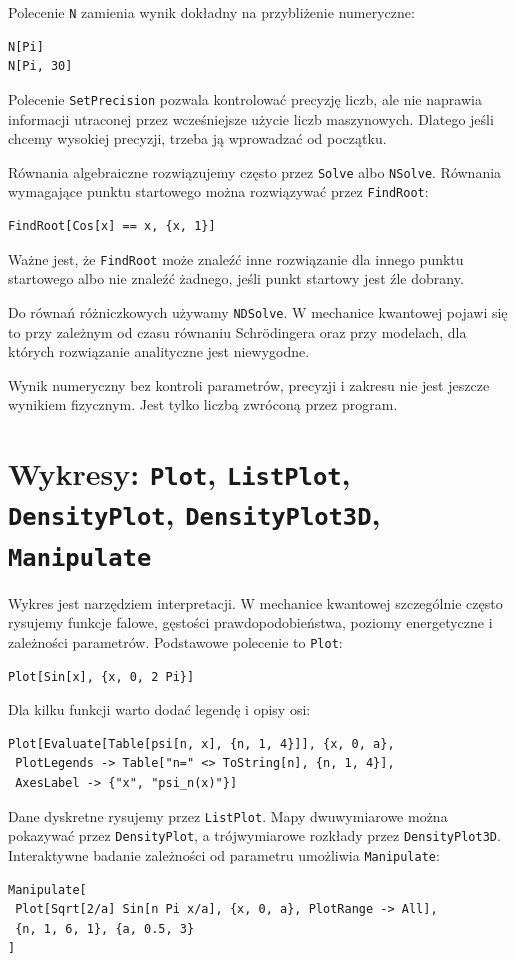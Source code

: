 Polecenie \texttt{N} zamienia wynik dokładny na przybliżenie numeryczne:
\begin{verbatim}
N[Pi]
N[Pi, 30]
\end{verbatim}
Polecenie \texttt{SetPrecision} pozwala kontrolować precyzję liczb, ale nie naprawia informacji utraconej przez wcześniejsze użycie liczb maszynowych. Dlatego jeśli chcemy wysokiej precyzji, trzeba ją wprowadzać od początku.

Równania algebraiczne rozwiązujemy często przez \texttt{Solve} albo \texttt{NSolve}. Równania wymagające punktu startowego można rozwiązywać przez \texttt{FindRoot}:
\begin{verbatim}
FindRoot[Cos[x] == x, {x, 1}]
\end{verbatim}
Ważne jest, że \texttt{FindRoot} może znaleźć inne rozwiązanie dla innego punktu startowego albo nie znaleźć żadnego, jeśli punkt startowy jest źle dobrany.

Do równań różniczkowych używamy \texttt{NDSolve}. W mechanice kwantowej pojawi się to przy zależnym od czasu równaniu Schrödingera oraz przy modelach, dla których rozwiązanie analityczne jest niewygodne.

\begin{remarkbox}
Wynik numeryczny bez kontroli parametrów, precyzji i zakresu nie jest jeszcze wynikiem fizycznym. Jest tylko liczbą zwróconą przez program.
\end{remarkbox}

\section{Wykresy: \texttt{Plot}, \texttt{ListPlot}, \texttt{DensityPlot}, \texttt{DensityPlot3D}, \texttt{Manipulate}}

Wykres jest narzędziem interpretacji. W mechanice kwantowej szczególnie często rysujemy funkcje falowe, gęstości prawdopodobieństwa, poziomy energetyczne i zależności parametrów. Podstawowe polecenie to \texttt{Plot}:
\begin{verbatim}
Plot[Sin[x], {x, 0, 2 Pi}]
\end{verbatim}

Dla kilku funkcji warto dodać legendę i opisy osi:
\begin{verbatim}
Plot[Evaluate[Table[psi[n, x], {n, 1, 4}]], {x, 0, a},
 PlotLegends -> Table["n=" <> ToString[n], {n, 1, 4}],
 AxesLabel -> {"x", "psi_n(x)"}]
\end{verbatim}

Dane dyskretne rysujemy przez \texttt{ListPlot}. Mapy dwuwymiarowe można pokazywać przez \texttt{DensityPlot}, a trójwymiarowe rozkłady przez \texttt{DensityPlot3D}. Interaktywne badanie zależności od parametru umożliwia \texttt{Manipulate}:
\begin{verbatim}
Manipulate[
 Plot[Sqrt[2/a] Sin[n Pi x/a], {x, 0, a}, PlotRange -> All],
 {n, 1, 6, 1}, {a, 0.5, 3}
]
\end{verbatim}

